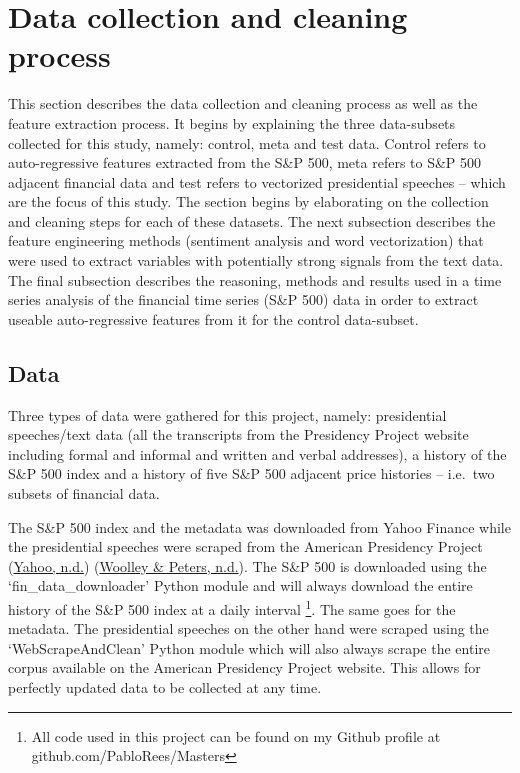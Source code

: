 \documentclass[11pt,preprint, authoryear]{elsarticle}
\numberwithin{equation}{section}
\numberwithin{figure}{section}
\numberwithin{table}{section}
\let\rmarkdownfootnote\footnote%
\def\footnote{\protect\rmarkdownfootnote}
\begin{document}
\hypertarget{data-collection-and-cleaning-process}{%
\section{Data collection and cleaning
process}\label{data-collection-and-cleaning-process}}

This section describes the data collection and cleaning process as well
as the feature extraction process. It begins by explaining the three
data-subsets collected for this study, namely: control, meta and test
data. Control refers to auto-regressive features extracted from the S\&P
500, meta refers to S\&P 500 adjacent financial data and test refers to
vectorized presidential speeches -- which are the focus of this study.
The section begins by elaborating on the collection and cleaning steps
for each of these datasets. The next subsection describes the feature
engineering methods (sentiment analysis and word vectorization) that
were used to extract variables with potentially strong signals from the
text data. The final subsection describes the reasoning, methods and
results used in a time series analysis of the financial time series
(S\&P 500) data in order to extract useable auto-regressive features
from it for the control data-subset.

\hypertarget{data}{%
\subsection{Data}\label{data}}

Three types of data were gathered for this project, namely: presidential
speeches/text data (all the transcripts from the Presidency Project
website including formal and informal and written and verbal addresses),
a history of the S\&P 500 index and a history of five S\&P 500 adjacent
price histories -- i.e.~two subsets of financial data.

The S\&P 500 index and the metadata was downloaded from Yahoo Finance
while the presidential speeches were scraped from the American
Presidency Project (\protect\hyperlink{ref-yahooSP500}{Yahoo, n.d.})
(\protect\hyperlink{ref-americanPresProj1}{Woolley \& Peters, n.d.}).
The S\&P 500 is downloaded using the `fin\_data\_downloader' Python
module and will always download the entire history of the S\&P 500 index
at a daily interval \footnote{All code used in this project can be found
  on my Github profile at github.com/PabloRees/Masters}. The same goes
for the metadata. The presidential speeches on the other hand were
scraped using the `WebScrapeAndClean' Python module which will also
always scrape the entire corpus available on the American Presidency
Project website. This allows for perfectly updated data to be collected
at any time.
\end{document}
